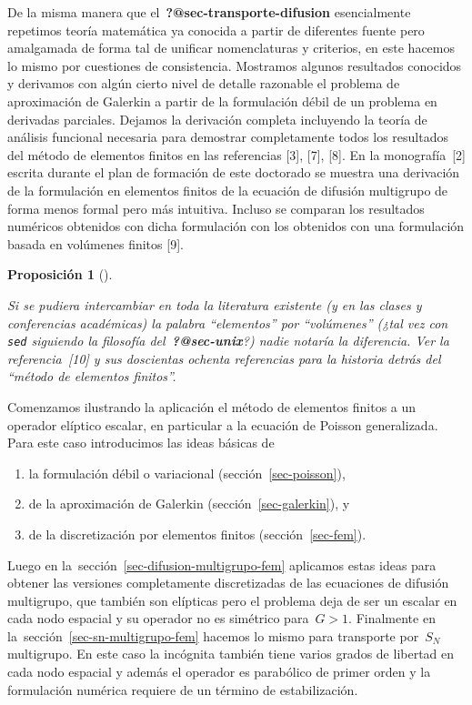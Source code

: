 \documentclass[
  12pt,
  a4paper,
  table]{scrbook}
\newcommand{\passthrough}[1]{#1}
\providecommand{\tightlist}{%
  \setlength{\itemsep}{0pt}\setlength{\parskip}{0pt}}\usepackage{longtable,booktabs,array}
\theoremstyle{plain}
\newtheorem{proposition}{Proposición}[chapter]
\theoremstyle{definition}
\theoremstyle{plain}
\theoremstyle{plain}
\theoremstyle{remark}
\begin{document}
De la misma manera que el~\textbf{?@sec-transporte-difusion}
esencialmente repetimos teoría matemática ya conocida a partir de
diferentes fuente pero amalgamada de forma tal de unificar nomenclaturas
y criterios, en este hacemos lo mismo por cuestiones de consistencia.
Mostramos algunos resultados conocidos y derivamos con algún cierto
nivel de detalle razonable el problema de aproximación de Galerkin a
partir de la formulación débil de un problema en derivadas parciales.
Dejamos la derivación completa incluyendo la teoría de análisis
funcional necesaria para demostrar completamente todos los resultados
del método de elementos finitos en las referencias {[}3{]}, {[}7{]},
{[}8{]}. En la monografía~{[}2{]} escrita durante el plan de formación
de este doctorado se muestra una derivación de la formulación en
elementos finitos de la ecuación de difusión multigrupo de forma menos
formal pero más intuitiva. Incluso se comparan los resultados numéricos
obtenidos con dicha formulación con los obtenidos con una formulación
basada en volúmenes finitos {[}9{]}.

\begin{proposition}[]\protect\hypertarget{prp-fem-fvm}{}\label{prp-fem-fvm}

Si se pudiera intercambiar en toda la literatura existente (y en las
clases y conferencias académicas) la palabra ``elementos'' por
``volúmenes'' (¿tal vez con \passthrough{\lstinline!sed!} siguiendo la
filosofía del~\textbf{?@sec-unix}?) nadie notaría la diferencia. Ver la
referencia~{[}10{]} y sus doscientas ochenta referencias para la
historia detrás del ``método de elementos finitos''.

\end{proposition}

Comenzamos ilustrando la aplicación el método de elementos finitos a un
operador elíptico escalar, en particular a la ecuación de Poisson
generalizada. Para este caso introducimos las ideas básicas de

\begin{enumerate}
\def\labelenumi{\roman{enumi}.}
\tightlist
\item
  la formulación débil o variacional (sección~\ref{sec-poisson}),
\item
  de la aproximación de Galerkin (sección~\ref{sec-galerkin}), y
\item
  de la discretización por elementos finitos (sección~\ref{sec-fem}).
\end{enumerate}

Luego en la~sección~\ref{sec-difusion-multigrupo-fem} aplicamos estas
ideas para obtener las versiones completamente discretizadas de las
ecuaciones de difusión multigrupo, que también son elípticas pero el
problema deja de ser un escalar en cada nodo espacial y su operador no
es simétrico para~\(G>1\). Finalmente en
la~sección~\ref{sec-sn-multigrupo-fem} hacemos lo mismo para transporte
por~\(S_N\) multigrupo. En este caso la incógnita también tiene varios
grados de libertad en cada nodo espacial y además el operador es
parabólico de primer orden y la formulación numérica requiere de un
término de estabilización.
\end{document}
